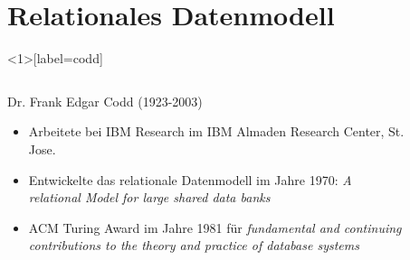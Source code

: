 \section{Relationales Datenmodell}

\begin{frame}<1>[label=codd]{\insertsection}
	\begin{columns}
		\begin{column}{.68\textwidth}
			\begin{block}{Dr. Frank Edgar Codd (1923-2003)}
				\begin{itemize}
					\item Arbeitete bei IBM Research im IBM Almaden Research Center, St. Jose.
					\item Entwickelte das relationale Datenmodell im Jahre 1970: \emph{A relational Model for large shared data banks}
					\item ACM Turing Award im Jahre 1981 für \emph{\glqq fundamental and continuing contributions to the theory 
						and practice of database systems\grqq}
				\end{itemize}
			\end{block}

		\end{column}
		\begin{column}{.30\textwidth}
		 	\begin{figure}
			\end{figure}
		\end{column}
	\end{columns}
\end{frame}

